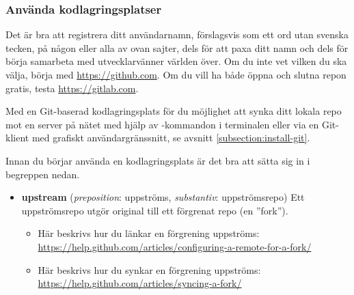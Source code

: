 \subsubsection{Använda kodlagringsplatser}

Det är bra att registrera ditt användarnamn, förslagsvis  som ett ord utan svenska tecken, på någon eller alla av ovan sajter, dels för att paxa ditt namn och dels för börja samarbeta med utvecklarvänner världen över. Om du inte vet vilken du ska välja, börja med \url{https://github.com}. Om du vill ha både öppna och slutna repon gratis, testa \url{https://gitlab.com}. 

Med en Git-baserad kodlagringsplats för du möjlighet att synka ditt lokala repo mot en server på nätet med hjälp av -kommandon i terminalen eller via en Git-klient med grafiskt användargränssnitt, se avsnitt \ref{subsection:install-git}. 

Innan du börjar använda en kodlagringsplats är det bra att sätta sig in i begreppen nedan.

\begin{itemize}
 Genom att klona ett repo som ligger på en nätlagringsplats kan du bygga, undersöka och vidareutveckla koden lokalt på din dator. Om du har rättigheter att lämna in kod till det centrala originalet kan du pusha dina commits direkt via terminalkommando eller Git-klient.

 Genom att förgrena ett repo skapar du en kopia, normalt även den nätlagrad på en kodlagringsplats, som du kan utveckla separat från originalet. Det blir då möjligt för dig att lämna in ändringar och trycka upp dem, även om du inte har rättigheter att leverera (''pusha'') till originalet. Gör en ändringsbegäran (Pull Request, PR) om du vill bidra med dina ändringar, så kan ägaren av originalet sedan välja att sammanfoga (''merga'') dina ändringar med originalet. Många nätlagringsplatser, så som GitHub, har en speciell knapp som du trycker på för att enkelt skapa en fork av ett repo under din användare. 

\item \textbf{upstream} (\textit{preposition}: uppströms, \textit{substantiv}: uppströmsrepo) Ett uppströmsrepo utgör original till ett förgrenat repo (en ''fork''). 
\begin{itemize}[noitemsep,nolistsep]

\item Här beskrivs hur du länkar en förgrening uppströms: \\ 
{\small\url{https://help.github.com/articles/configuring-a-remote-for-a-fork/}}

\item Här beskrivs hur du synkar en förgrening uppströms:\\
{\small\url{https://help.github.com/articles/syncing-a-fork/}}

\end{itemize}

\end{itemize}

